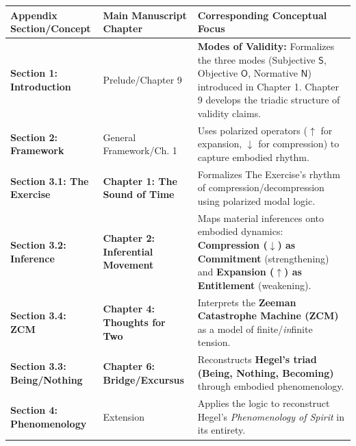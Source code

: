 \documentclass[12pt]{book}
\begin{document}
\begin{longtable}[]{@{}
  >{\raggedright\arraybackslash}p{}
  >{\raggedright\arraybackslash}p{}
  >{\raggedright\arraybackslash}p{}@{}}
\toprule\noalign{}
\begin{minipage}[b]{\linewidth}\raggedright
Appendix Section/Concept
\end{minipage} & \begin{minipage}[b]{\linewidth}\raggedright
Main Manuscript Chapter
\end{minipage} & \begin{minipage}[b]{\linewidth}\raggedright
Corresponding Conceptual Focus
\end{minipage} \\
\midrule\noalign{}
\endhead
\bottomrule\noalign{}
\endlastfoot
\textbf{Section 1: Introduction} & Prelude/Chapter 9 & \textbf{Modes of Validity:} Formalizes the three modes (Subjective $\mathsf{S}$, Objective $\mathsf{O}$, Normative $\mathsf{N}$) introduced in Chapter 1. Chapter 9 develops the triadic structure of validity claims. \\
\textbf{Section 2: Framework} & General Framework/Ch. 1 & Uses polarized operators ($\uparrow$ for expansion, $\downarrow$ for compression) to capture embodied rhythm. \\
\textbf{Section 3.1: The Exercise} & \textbf{Chapter 1: The Sound of Time} & Formalizes The Exercise's rhythm of compression/decompression using polarized modal logic. \\
\textbf{Section 3.2: Inference} & \textbf{Chapter 2: Inferential Movement} & Maps material inferences onto embodied dynamics: \textbf{Compression ($\downarrow$) as Commitment} (strengthening) and \textbf{Expansion ($\uparrow$) as Entitlement} (weakening). \\
\textbf{Section 3.4: ZCM} & \textbf{Chapter 4: Thoughts for Two} & Interprets the \textbf{Zeeman Catastrophe Machine (ZCM)} as a model of finite/\emph{in}finite tension. \\
\textbf{Section 3.3: Being/Nothing} & \textbf{Chapter 6: Bridge/Excursus} & Reconstructs \textbf{Hegel's triad (Being, Nothing, Becoming)} through embodied phenomenology. \\
\textbf{Section 4: Phenomenology} & Extension & Applies the logic to reconstruct Hegel's \emph{Phenomenology of Spirit} in its entirety. \\
\end{longtable}
\end{document}
